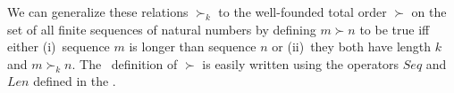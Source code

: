 \documentclass[fleqn,leqno]{article}
\begin{document}

We can generalize these relations $\succ_{\!\!k}$ to the well-founded
total order $\succ$ on the set of all finite sequences of natural
numbers by defining $m \succ n$ to be true iff either (i)~sequence $m$
is longer than sequence $n$ or (ii)~they both have length $k$ and $m
\succ_{\!\!k} n$.  The \tlaplus\ definition of $\succ$ is easily
written using the operators $Seq$ and $Len$ defined in the 
.
\end{document}
